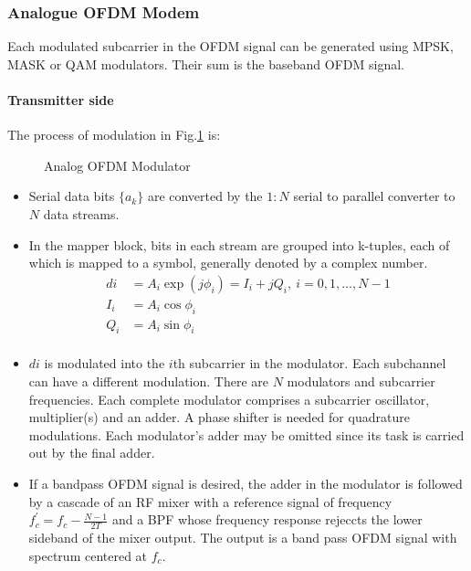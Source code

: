 \subsubsection{Analogue \gls{OFDM} Modem}
Each modulated subcarrier in the \gls{OFDM} signal can be generated using \gls{MPSK}, \gls{MASK} or \gls{QAM} modulators. Their sum is the baseband \gls{OFDM} signal. 
\paragraph{Transmitter side}
The process of modulation in Fig.\ref{fig:anal_mod} is\cite{fuqin}:
\begin{figure}[h!]
	\centerline{\resizebox{16cm}{!}{}}
	\caption{Analog \gls{OFDM} Modulator}
	\label{fig:anal_mod}
\end{figure}
\begin{itemize}
	\item Serial data bits $\{ a_k\}$ are converted by the $1:N$ serial to parallel converter to $N$ data streams.
	\item In the mapper block, bits in each stream are grouped into k-tuples, each of which is mapped to a symbol, generally denoted by a complex number.
	\begin{align*}
	di &= A_i\exp (j\phi_i) = I_i + jQ_i,\ i=0,1,\ldots,N-1\\
	I_i &= A_i\cos \phi_i\\
	Q_i &= A_i\sin\phi_i\\
	\end{align*}
	\item $di$ is modulated into the $i$th subcarrier in the modulator. Each subchannel can have a different modulation. There are $N$ modulators and subcarrier frequencies. Each complete modulator comprises a subcarrier oscillator, multiplier(s) and an adder. A phase shifter is needed for quadrature modulations. Each modulator's adder may be omitted since its task is carried out by the final adder.
	\item If a bandpass OFDM signal is desired, the adder in the modulator is followed by a cascade of an RF mixer with a reference signal of frequency $f_c^\prime = f_c - \frac{N-1}{2T}$ and a \gls{BPF} whose frequency response rejeccts the lower sideband of the mixer output. The output is a band pass OFDM signal with spectrum centered at $f_c$. 
\end{itemize}

